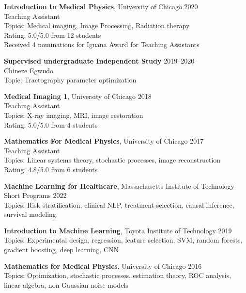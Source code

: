 \documentclass[10pt,letterpaper]{article}
\begin{document}
\begin{benumerate}{4}

\item
  \textbf{Introduction to Medical Physics}, University of Chicago \hfill 2020\\
  Teaching Assistant\\
  Topics: Medical imaging, Image Processing, Radiation therapy\\
  Rating: 5.0/5.0 from 12 students\\
  Received 4 nominations for Iguana Award for Teaching Assistants
\item
  \textbf{Supervised undergraduate Independent Study} \hfill 2019--2020\\
  Chineze Egwudo\\
  Topic: Tractography parameter optimization
  
\item
  \textbf{Medical Imaging 1}, University of Chicago \hfill 2018\\
  Teaching Assistant\\
  Topics: X-ray imaging, MRI, image restoration\\
  Rating: 5.0/5.0 from 4 students
\item
  \textbf{Mathematics For Medical Physics}, University of Chicago \hfill 2017\\
  Teaching Assistant\\
  Topics: Linear systems theory, stochastic processes, image reconstruction\\
  Rating: 4.8/5.0 from 6 students
\end{benumerate}

\begin{benumerate}{3}

\item
  \textbf{Machine Learning for Healthcare}, Massachusetts Institute of Technology Short Programs \hfill 2022\\
  Topics: Risk stratification, clinical NLP, treatment selection, causal inference, survival modeling

\item  
  \textbf{Introduction to Machine Learning}, Toyota Institute of Technology \hfill 2019\\
  Topics: Experimental design, regression, feature selection, SVM, random forests, gradient boosting, deep learning, CNN

\item
  \textbf{Mathematics for Medical Physics}, University of Chicago \hfill 2016\\
  Topics: Optimization, stochastic processes, estimation theory, ROC analysis, linear algebra, non-Gaussian noise models

\end{benumerate}
\end{document}

